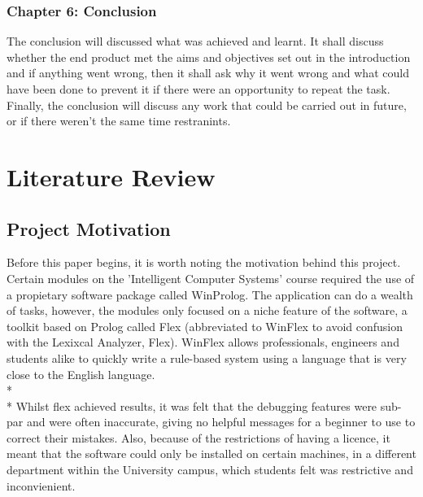 \documentclass[12pt]{report}
\begin{document}
\subsection{Chapter 6: Conclusion}\label{sec:sub:chapter6}
The conclusion will discussed what was achieved and learnt.  It shall discuss whether the end product met the aims and objectives set out in the introduction and if anything went wrong, then it shall ask why it went wrong and what could have been done to prevent it if there were an opportunity to repeat the task.  Finally, the conclusion will discuss any work that could be carried out in future, or if there weren't the same time restranints.
\chapter{Literature Review}
\section{Project Motivation}\label{sec:project_motivation}
Before this paper begins, it is worth noting the motivation behind this project.  Certain modules on the 'Intelligent Computer Systems' course required the use of a propietary software package called WinProlog.  The application can do a wealth of tasks, however, the modules only focused on a niche feature of the software, a toolkit based on Prolog called Flex (abbreviated to WinFlex to avoid confusion with the Lexixcal Analyzer, Flex).  WinFlex allows professionals, engineers and students alike to quickly write a rule-based system using a language that is very close to the English language.
\\*
\\*
Whilst flex achieved results, it was felt that the debugging features were sub-par and were often inaccurate, giving no helpful messages for a beginner to use to correct their mistakes.  Also, because of the restrictions of having a licence, it meant that the software could only be installed on certain machines, in a different department within the University campus, which students felt was restrictive and inconvienient.
\\
\\
\\
\\
\end{document}
